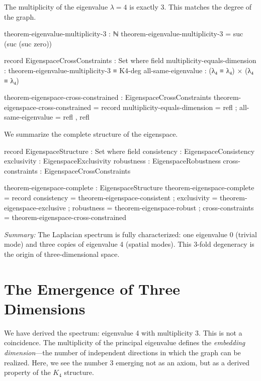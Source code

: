 \documentclass[11pt,a4paper]{book}
\begin{document}
The multiplicity of the eigenvalue $\lambda=4$ is exactly 3. This matches the degree of the graph.

\begin{code}
theorem-eigenvalue-multiplicity-3 : ℕ
theorem-eigenvalue-multiplicity-3 = suc (suc (suc zero))

record EigenspaceCrossConstraints : Set where
  field
    multiplicity-equals-dimension : theorem-eigenvalue-multiplicity-3 ≡ K4-deg
    all-same-eigenvalue : (λ₄ ≡ λ₄) × (λ₄ ≡ λ₄)

theorem-eigenspace-cross-constrained : EigenspaceCrossConstraints  
theorem-eigenspace-cross-constrained = record
  { multiplicity-equals-dimension = refl
  ; all-same-eigenvalue = refl , refl
  }

\end{code}

We summarize the complete structure of the eigenspace.

\begin{code}
record EigenspaceStructure : Set where
  field
    consistency      : EigenspaceConsistency
    exclusivity      : EigenspaceExclusivity
    robustness       : EigenspaceRobustness
    cross-constraints : EigenspaceCrossConstraints

theorem-eigenspace-complete : EigenspaceStructure
theorem-eigenspace-complete = record
  { consistency = theorem-eigenspace-consistent
  ; exclusivity = theorem-eigenspace-exclusive
  ; robustness = theorem-eigenspace-robust
  ; cross-constraints = theorem-eigenspace-cross-constrained
  }
\end{code}

\medskip
\noindent\textit{Summary:} The Laplacian spectrum is fully characterized: one eigenvalue 0 
(trivial mode) and three copies of eigenvalue 4 (spatial modes). This 3-fold degeneracy 
is the origin of three-dimensional space.

\chapter{The Emergence of Three Dimensions}
\label{chap:three-dimensions}

We have derived the spectrum: eigenvalue 4 with multiplicity 3. This is not a coincidence. 
The multiplicity of the principal eigenvalue defines the \emph{embedding dimension}—the 
number of independent directions in which the graph can be realized. Here, we see the 
number 3 emerging not as an axiom, but as a derived property of the $K_4$ structure.
\end{document}

